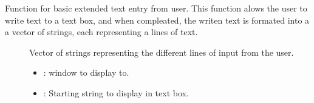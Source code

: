 \documentclass[letterpaper,10pt,english]{sphinxmanual}
\begin{document}
\begin{fulllineitems}
\begin{fulllineitems}
\label{\detokenize{index:_CPPv2N7ostendo8VTextBoxEN7ostendo6WindowENSt6stringE}}%
\pysigstartmultiline
{}\label{\detokenize{index:Pessumnamespaceostendo_1a96fb1afad5e7a28a2c1f63066930683f}}%
\pysigstopmultiline
Function for basic extended text entry from user. This function alows the user to write text to a text box, and when compleated, the writen text is formated into a a vector of strings, each representing a lines of text. \begin{description}
\item[{}] \leavevmode
Vector of strings representing the different lines of input from the user. 

\item[{}] \leavevmode
{\hyperref[\detokenize{index:Pessumclassostendo_1_1Window}]{}} 

\item[{}] \leavevmode\begin{itemize}
\item {} 
: window to display to. 

\item {} 
: Starting string to display in text box. 

\end{itemize}

\end{description}


\end{fulllineitems}



\end{fulllineitems}
\end{document}
